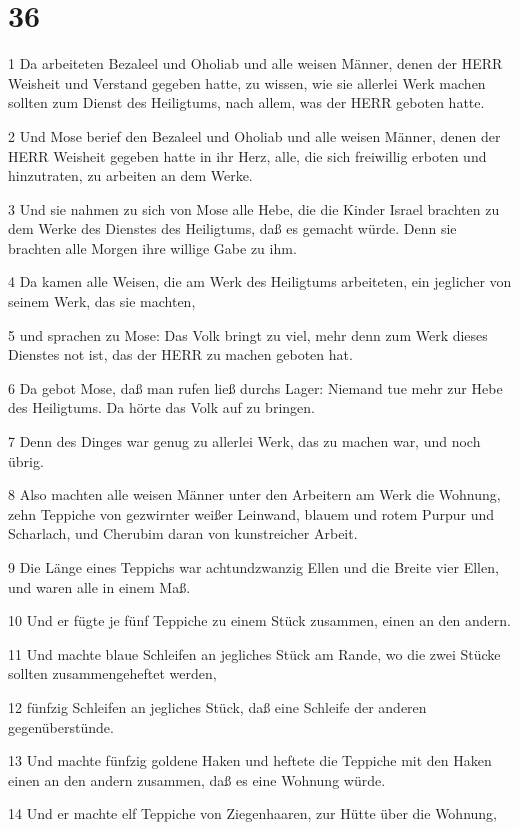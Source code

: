 \chapter{36}

\par 1 Da arbeiteten Bezaleel und Oholiab und alle weisen Männer, denen der HERR Weisheit und Verstand gegeben hatte, zu wissen, wie sie allerlei Werk machen sollten zum Dienst des Heiligtums, nach allem, was der HERR geboten hatte.
\par 2 Und Mose berief den Bezaleel und Oholiab und alle weisen Männer, denen der HERR Weisheit gegeben hatte in ihr Herz, alle, die sich freiwillig erboten und hinzutraten, zu arbeiten an dem Werke.
\par 3 Und sie nahmen zu sich von Mose alle Hebe, die die Kinder Israel brachten zu dem Werke des Dienstes des Heiligtums, daß es gemacht würde. Denn sie brachten alle Morgen ihre willige Gabe zu ihm.
\par 4 Da kamen alle Weisen, die am Werk des Heiligtums arbeiteten, ein jeglicher von seinem Werk, das sie machten,
\par 5 und sprachen zu Mose: Das Volk bringt zu viel, mehr denn zum Werk dieses Dienstes not ist, das der HERR zu machen geboten hat.
\par 6 Da gebot Mose, daß man rufen ließ durchs Lager: Niemand tue mehr zur Hebe des Heiligtums. Da hörte das Volk auf zu bringen.
\par 7 Denn des Dinges war genug zu allerlei Werk, das zu machen war, und noch übrig.
\par 8 Also machten alle weisen Männer unter den Arbeitern am Werk die Wohnung, zehn Teppiche von gezwirnter weißer Leinwand, blauem und rotem Purpur und Scharlach, und Cherubim daran von kunstreicher Arbeit.
\par 9 Die Länge eines Teppichs war achtundzwanzig Ellen und die Breite vier Ellen, und waren alle in einem Maß.
\par 10 Und er fügte je fünf Teppiche zu einem Stück zusammen, einen an den andern.
\par 11 Und machte blaue Schleifen an jegliches Stück am Rande, wo die zwei Stücke sollten zusammengeheftet werden,
\par 12 fünfzig Schleifen an jegliches Stück, daß eine Schleife der anderen gegenüberstünde.
\par 13 Und machte fünfzig goldene Haken und heftete die Teppiche mit den Haken einen an den andern zusammen, daß es eine Wohnung würde.
\par 14 Und er machte elf Teppiche von Ziegenhaaren, zur Hütte über die Wohnung,
